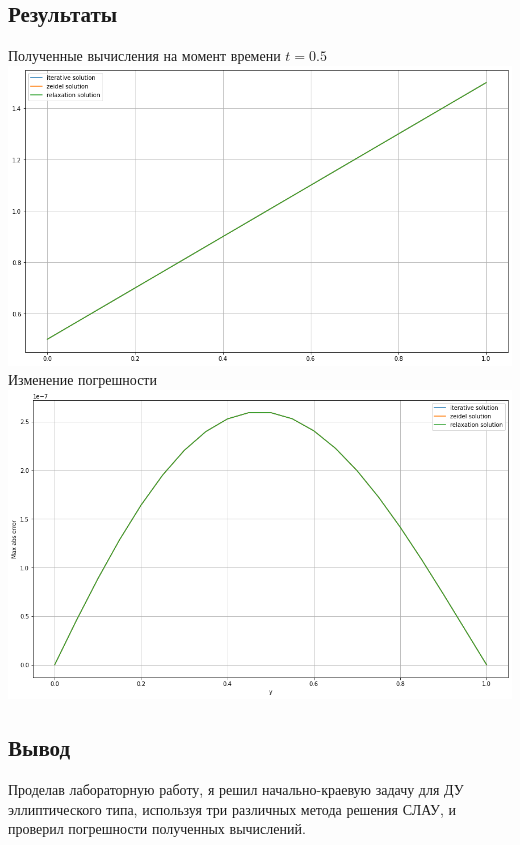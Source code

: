 \documentclass{article}
\begin{document}
\subsection*{Результаты}
\begin{center}
Полученные вычисления на момент времени $ t = 0.5 $
\\
\includegraphics[scale=0.25]{img/img01.png}
\pagebreak
\\
Изменение погрешности
\\
\includegraphics[scale=0.25]{img/img02.png}
\end{center}

\subsection*{Вывод}
Проделав лабораторную работу, я решил начально-краевую задачу для ДУ 
эллиптического типа, используя три различных метода решения СЛАУ, и проверил 
погрешности полученных вычислений.
\end{document}
